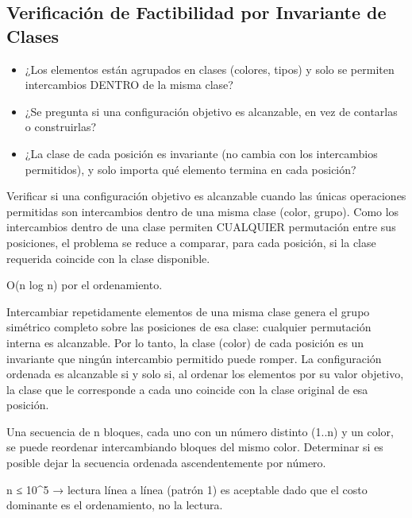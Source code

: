 \subsection{Verificación de Factibilidad por Invariante de Clases}


\begin{itemize}
\item ¿Los elementos están agrupados en clases (colores, tipos) y solo se permiten intercambios DENTRO de la misma clase?
\item ¿Se pregunta si una configuración objetivo es alcanzable, en vez de contarlas o construirlas?
\item ¿La clase de cada posición es invariante (no cambia con los intercambios permitidos), y solo importa qué elemento termina en cada posición?
\end{itemize}

 Verificar si una configuración objetivo es alcanzable cuando las únicas operaciones permitidas son intercambios dentro de una misma clase (color, grupo). Como los intercambios dentro de una clase permiten CUALQUIER permutación entre sus posiciones, el problema se reduce a comparar, para cada posición, si la clase requerida coincide con la clase disponible.

 O(n log n) por el ordenamiento.

 Intercambiar repetidamente elementos de una misma clase genera el grupo simétrico completo sobre las posiciones de esa clase: cualquier permutación interna es alcanzable. Por lo tanto, la clase (color) de cada posición es un invariante que ningún intercambio permitido puede romper. La configuración ordenada es alcanzable si y solo si, al ordenar los elementos por su valor objetivo, la clase que le corresponde a cada uno coincide con la clase original de esa posición.


Una secuencia de n bloques, cada uno con un número distinto (1..n) y un color, se puede reordenar intercambiando bloques del mismo color. Determinar si es posible dejar la secuencia ordenada ascendentemente por número.

 n ≤ 10\textasciicircum{}5 → lectura línea a línea (patrón 1) es aceptable dado que el costo dominante es el ordenamiento, no la lectura.


